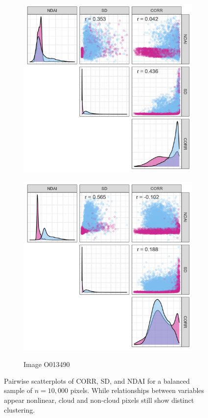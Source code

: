 \documentclass[10pt,letterpaper]{article}
\begin{document}
\begin{figure}[ht]
\begin{subfigure}[t]{0.3\textwidth}
        \includegraphics[width=\textwidth]{figs/corr42_void.png}
        \label{subfig:corr42}
    \end{subfigure}
    \hfill
    \begin{subfigure}[t]{0.3\textwidth}
        \centering
        \caption{Image O013490}
        \includegraphics[width=\textwidth]{figs/corr43_void.png}
        \label{subfig:corr43}
    \end{subfigure}
    \caption{Pairwise scatterplots of CORR, SD, and NDAI for a balanced sample of $n=10,000$ pixels. While relationships between variables appear nonlinear, cloud and non-cloud pixels still show distinct clustering.}
    \label{fig:corr4}
\end{figure}
\end{document}
